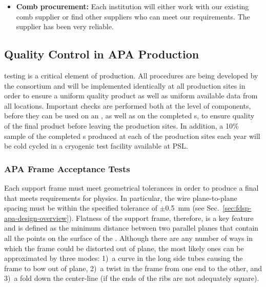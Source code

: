 \begin{itemize}
\item {\bf Comb procurement:} Each institution will either work with our existing comb supplier or find other suppliers who can meet our requirements. The  supplier has been very reliable.


\end{itemize}


\subsection{Quality Control in APA Production}
\label{sec:fdsp-apa-prod-qc}


 testing is a critical element of  production.  All  procedures are being developed by the consortium and will be implemented identically at all production sites in order to ensure a uniform quality product as well as uniform available data from all locations.  Important  checks are performed both at the level of components, before they can be used on an , as well as on the completed s, to ensure quality of the final product before leaving the production sites.  In addition, a 10\% sample of the completed s produced at each of the production sites each year will be cold cycled in a cryogenic test facility available at PSL.

\subsubsection{APA Frame Acceptance Tests} 

Each  support frame must meet geometrical tolerances in order to produce a final  that meets requirements for physics. In particular, the wire plane-to-plane spacing must be within the specified tolerance of $\pm$\SI{0.5}{mm} (see Sec.~\ref{sec:fdsp-apa-design-overview}).  Flatness of the support frame, therefore, is a key feature and is defined as the minimum distance between two parallel planes that contain all the points on the surface of the .  Although there are any number of ways in which the frame could be distorted out of plane, the most likely ones can be approximated by three modes: 1)~a curve in the long side tubes causing the frame to bow out of plane, 2)~a twist in the frame from one end to the other, and 3)~a fold down the center-line (if the ends of the ribs are not adequately square).

